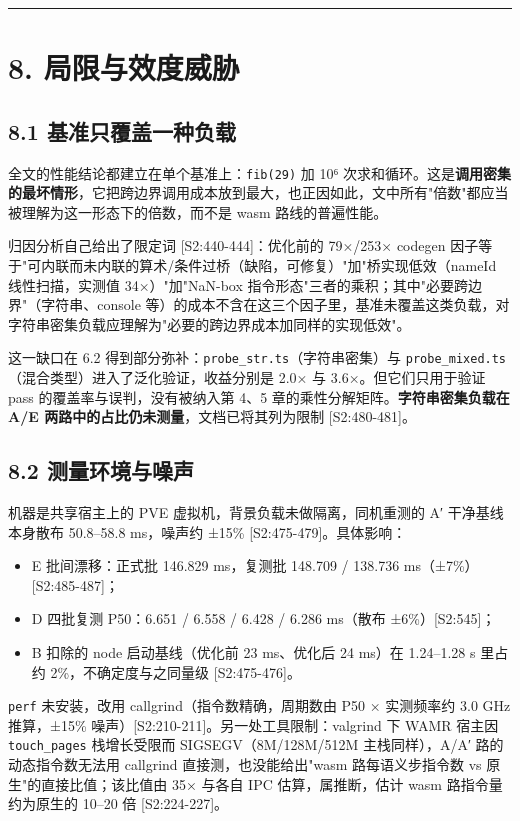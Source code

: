 \documentclass[11pt, a4paper]{article}
\begin{document}
\bigskip\hrule\bigskip

\section{8. 局限与效度威胁}

\subsection{8.1 基准只覆盖一种负载}

全文的性能结论都建立在单个基准上：\texttt{fib(29)} 加 10⁶ 次求和循环。这是\textbf{调用密集的最坏情形}，它把跨边界调用成本放到最大，也正因如此，文中所有"倍数"都应当被理解为这一形态下的倍数，而不是 wasm 路线的普遍性能。


归因分析自己给出了限定词 [S2:440-444]：优化前的 79×/253× codegen 因子等于"可内联而未内联的算术/条件过桥（缺陷，可修复）"加"桥实现低效（nameId 线性扫描，实测值 34×）"加"NaN-box 指令形态"三者的乘积；其中"必要跨边界"（字符串、console 等）的成本不含在这三个因子里，基准未覆盖这类负载，对字符串密集负载应理解为"必要的跨边界成本加同样的实现低效"。


这一缺口在 6.2 得到部分弥补：\texttt{probe\_str.ts}（字符串密集）与 \texttt{probe\_mixed.ts}（混合类型）进入了泛化验证，收益分别是 2.0× 与 3.6×。但它们只用于验证 pass 的覆盖率与误判，没有被纳入第 4、5 章的乘性分解矩阵。\textbf{字符串密集负载在 A/E 两路中的占比仍未测量}，文档已将其列为限制 [S2:480-481]。


\subsection{8.2 测量环境与噪声}

机器是共享宿主上的 PVE 虚拟机，背景负载未做隔离，同机重测的 A′ 干净基线本身散布 50.8–58.8 ms，噪声约 ±15\% [S2:475-479]。具体影响：


\begin{itemize}
\item E 批间漂移：正式批 146.829 ms，复测批 148.709 / 138.736 ms（±7\%）[S2:485-487]；
\item D 四批复测 P50：6.651 / 6.558 / 6.428 / 6.286 ms（散布 ±6\%）[S2:545]；
\item B 扣除的 node 启动基线（优化前 23 ms、优化后 24 ms）在 1.24–1.28 s 里占约 2\%，不确定度与之同量级 [S2:475-476]。
\end{itemize}

\texttt{perf} 未安装，改用 callgrind（指令数精确，周期数由 P50 × 实测频率约 3.0 GHz 推算，±15\% 噪声）[S2:210-211]。另一处工具限制：valgrind 下 WAMR 宿主因 \texttt{touch\_pages} 栈增长受限而 SIGSEGV（8M/128M/512M 主栈同样），A/A′ 路的动态指令数无法用 callgrind 直接测，也没能给出"wasm 路每语义步指令数 vs 原生"的直接比值；该比值由 35× 与各自 IPC 估算，属推断，估计 wasm 路指令量约为原生的 10–20 倍 [S2:224-227]。
\end{document}
